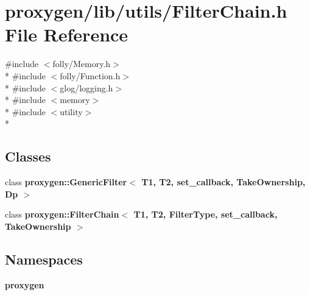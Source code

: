 \section{proxygen/lib/utils/\+Filter\+Chain.h File Reference}
\label{FilterChain_8h}
{\ttfamily \#include $<$folly/\+Memory.\+h$>$}\\*
{\ttfamily \#include $<$folly/\+Function.\+h$>$}\\*
{\ttfamily \#include $<$glog/logging.\+h$>$}\\*
{\ttfamily \#include $<$memory$>$}\\*
{\ttfamily \#include $<$utility$>$}\\*
\subsection*{Classes}
\begin{DoxyCompactItemize}
\item 
class {\bf proxygen\+::\+Generic\+Filter$<$ T1, T2, set\+\_\+callback, Take\+Ownership, Dp $>$}
\item 
class {\bf proxygen\+::\+Filter\+Chain$<$ T1, T2, Filter\+Type, set\+\_\+callback, Take\+Ownership $>$}
\end{DoxyCompactItemize}
\subsection*{Namespaces}
\begin{DoxyCompactItemize}
\item 
 {\bf proxygen}
\end{DoxyCompactItemize}
